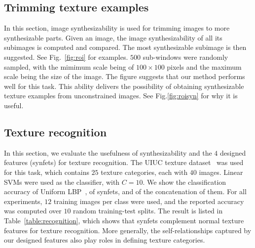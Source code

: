\documentclass[10pt,twocolumn,letterpaper]{article}
\begin{document}




\subsection{Trimming texture examples}
In this section, image synthesizability is used for trimming images to
more synthesizable parts. Given an image, the image synthesizability
of all its subimages is computed and compared. The most synthesizable
subimage is then suggested. See Fig.~\ref{fig:roi} for examples. $500$
sub-windows were randomly sampled, with the mimimum scale being of
$100 \times 100$ pixels and the maximum scale being the size of the
image. The figure suggests that our method performs well for this
task.  This ability delivers the possibility of obtaining
synthesizable texture examples from unconstrained images. See
Fig.\ref{fig:roisyn} for why it is useful.


\subsection{Texture recognition}
In this section, we evaluate the usefulness of synthesizability and
the $4$ designed features (synfets) for texture recognition. The UIUC
texture dataset~\cite{UIUC:Texture} was used for this task, which
contains $25$ texture categories, each with $40$ images. Linear SVMs
were used as the classifier, with $C=10$. We show the classification
accuracy of Uniform LBP~\cite{lbp:2002}, of synfets, and of the
concatenation of them. For all experiments, $12$ training images per
class were used, and the reported accuracy was computed over $10$
random training-test splits.  The result is listed in
Table~\ref{table:recognition}, which shows that synfets complement
normal texture features for texture recognition. More generally, the
self-relationships captured by our designed features also play roles
in defining texture categories.
\end{document}
